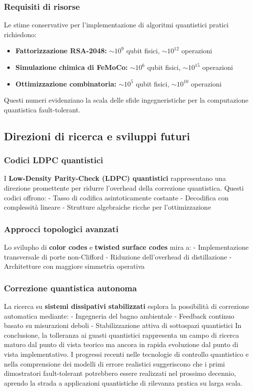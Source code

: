 \documentclass[a4paper,12pt]{report}
\theoremstyle{plain}
\begin{document}
\subsubsection{Requisiti di risorse}
Le stime conservative per l'implementazione di algoritmi quantistici pratici richiedono:
\begin{itemize}
\item \textbf{Fattorizzazione RSA-2048:} $\sim 10^9$ qubit fisici, $\sim 10^{12}$ operazioni
\item \textbf{Simulazione chimica di FeMoCo:} $\sim 10^6$ qubit fisici, $\sim 10^{15}$ operazioni
\item \textbf{Ottimizzazione combinatoria:} $\sim 10^5$ qubit fisici, $\sim 10^{10}$ operazioni
\end{itemize}
Questi numeri evidenziano la scala delle sfide ingegneristiche per la computazione quantistica fault-tolerant.
\subsection{Direzioni di ricerca e sviluppi futuri}
\subsubsection{Codici LDPC quantistici}
I \textbf{Low-Density Parity-Check (LDPC) quantistici} rappresentano una direzione promettente per ridurre l'overhead della correzione quantistica. Questi codici offrono:
- Tasso di codifica asintoticamente costante
- Decodifica con complessità lineare
- Strutture algebraiche ricche per l'ottimizzazione
\subsubsection{Approcci topologici avanzati}
Lo svilupho di \textbf{color codes} e \textbf{twisted surface codes} mira a:
- Implementazione transversale di porte non-Clifford
- Riduzione dell'overhead di distillazione
- Architetture con maggiore simmetria operativa
\subsubsection{Correzione quantistica autonoma}
La ricerca su \textbf{sistemi dissipativi stabilizzati} esplora la possibilità di correzione automatica mediante:
- Ingegneria del bagno ambientale
- Feedback continuo basato su misurazioni deboli
- Stabilizzazione attiva di sottospazi quantistici
In conclusione, la tolleranza ai guasti quantistici rappresenta un campo di ricerca maturo dal punto di vista teorico ma ancora in rapida evoluzione dal punto di vista implementativo. I progressi recenti nelle tecnologie di controllo quantistico e nella comprensione dei modelli di errore realistici suggeriscono che i primi dimostratori fault-tolerant potrebbero essere realizzati nel prossimo decennio, aprendo la strada a applicazioni quantistiche di rilevanza pratica su larga scala.
\end{document}
